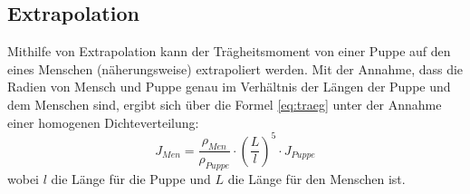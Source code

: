 \subsection{Extrapolation}
Mithilfe von Extrapolation kann der Trägheitsmoment von einer Puppe auf den eines Menschen (näherungsweise) extrapoliert werden. Mit der Annahme, dass die Radien von Mensch und Puppe genau im Verhältnis der Längen der Puppe und dem Menschen sind, ergibt sich über die Formel \ref{eq:traeg} unter der Annahme einer homogenen Dichteverteilung:
\begin{equation}
J_{Men} = \frac{\rho_{Men}}{\rho_{Puppe}} \cdot \left(\frac{L}{l}\right)^5 \cdot J_{Puppe}
\end{equation}
wobei $l$ die Länge für die Puppe und $L$ die Länge für den Menschen ist.








